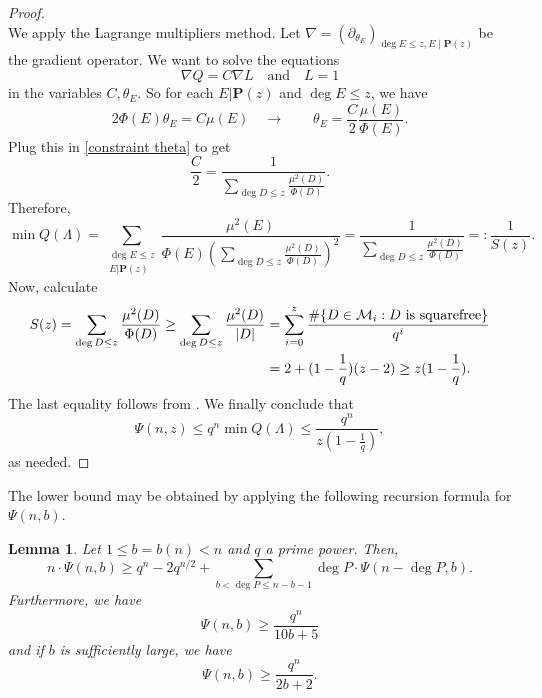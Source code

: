 \documentclass[12pt]{amsart}
\numberwithin{equation}{section}
\newtheorem{lemma}[theorem]{Lemma}
\theoremstyle{definition}
\theoremstyle{remark}
\newcommand{\ps}[1]{\left( #1 \right)}
\begin{document}
\begin{proof}
\begin{equation}
    \end{equation}
    We apply the Lagrange multipliers method. Let $\nabla = (\partial_{\theta_E})_{\deg E\leq z, E\mid \mathbf{P}(z)}$ be the gradient operator. We want to solve the equations
    \[
        \nabla Q = C \nabla L \quad \mbox{and} \quad L=1
    \]
    in the variables $C,\theta_E$. So for each $E|\mathbf{P}(z)$ and $\deg E \leq z$, we have
    \[
        2\Phi(E) \theta_E = C \mu(E) \quad \longrightarrow \qquad \theta_E = \frac{C}{2} \frac{\mu(E)}{\Phi(E)}.
    \] 
    Plug this in \eqref{constraint theta} to get
    \[
        \frac{C}{2} = \frac{1}{\sum_{\deg D \leq z} \frac{\mu^2(D)}{\Phi(D)}}.
    \]
    Therefore, 
    \[
        \min Q(\Lambda) = \sum_{\substack{\deg E \leq z \\ E|\mathbf{P}(z)}} \frac{\mu^2(E)}{\Phi(E)\ps{\sum_{\deg D \leq z} \frac{\mu^2(D)}{\Phi(D)}}^2} = \frac{1}{\sum_{\deg D \leq z} \frac{\mu^2(D)}{\Phi(D)}} =: \frac{1}{S(z)}.
    \]
    Now, calculate 
    \begin{align*}
        S(z) = \sum_{\deg D \leq z} \frac{\mu^2(D)}{\Phi(D)} \geq \sum_{\deg D \leq z} \frac{\mu^2(D)}{|D|} &= \sum_{i=0}^z \frac{\#\{ D \in \mathcal{M}_i : D \textnormal{ is squarefree} \}}{q^i}  \\
        &= 2 + (1-\frac{1}{q})(z-2) \geq z(1-\frac{1}{q}).
    \end{align*}
    The last equality follows from \cite[Proposition~2.3]{NumberTheory_FF}.
    We finally conclude that
    \[
        \Psi(n,z) \leq q^n \min Q(\Lambda) \leq \frac{q^n}{z(1-\frac{1}{q})}, 
    \]
    as needed.
\end{proof}

The lower bound may be obtained by applying the following recursion formula for $\Psi(n,b)$. 

\begin{lemma} \label{lm:rough polynomials lower bound}
    Let $1\leq b=b(n) < n$ and $q$ a prime power. Then,
    \begin{equation}\label{eq:rec}
        n \cdot \Psi(n,b) \geq q^n - 2q^{n/2} + \sum_{b < \deg P \leq n-b-1} \deg P \cdot \Psi(n-\deg P, b).
    \end{equation}    
    Furthermore, we have
        \begin{equation}\label{eq:allb}
        \Psi(n,b) \geq \frac{q^n}{10b+5}
    \end{equation}
    and if $b$ is sufficiently large, we have
    \begin{equation}\label{eq:lb_rough_b_large}
        \Psi(n,b) \geq  \frac{q^n}{2b+2}.
    \end{equation}  
\end{lemma}
\end{document}
